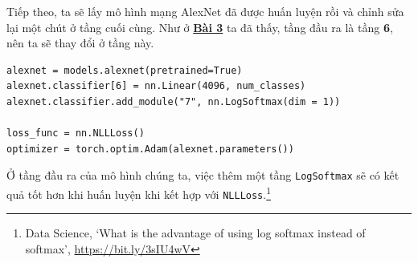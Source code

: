 \documentclass[a4paper]{article}
\begin{document}
Tiếp theo, ta sẽ lấy mô hình mạng AlexNet đã được huấn luyện rồi và chỉnh sửa lại một chút ở tầng cuối cùng. Như ở \hyperref[bai3]{\textbf{Bài 3}} ta đã thấy, tầng đầu ra là tầng \textbf{6}, nên ta sẽ thay đổi ở tầng này.
\begin{lstlisting}
alexnet = models.alexnet(pretrained=True)
alexnet.classifier[6] = nn.Linear(4096, num_classes)
alexnet.classifier.add_module("7", nn.LogSoftmax(dim = 1))

loss_func = nn.NLLLoss()
optimizer = torch.optim.Adam(alexnet.parameters())
\end{lstlisting}
Ở tầng đầu ra của mô hình chúng ta, việc thêm một tầng \texttt{LogSoftmax} sẽ có kết quả tốt hơn khi huấn luyện khi kết hợp với \texttt{NLLLoss}.\footnote{Data Science, \lq What is the advantage of using log softmax instead of softmax\rq, \href{https://bit.ly/3sIU4wV}{https://bit.ly/3sIU4wV}}
\end{document}
